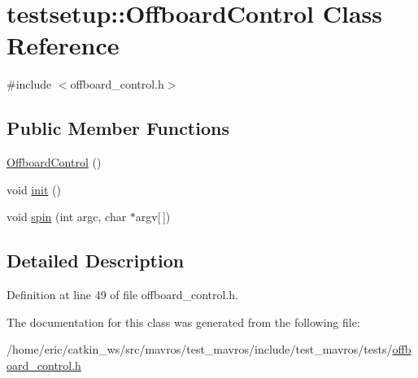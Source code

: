 \hypertarget{classtestsetup_1_1OffboardControl}{}\section{testsetup\+::Offboard\+Control Class Reference}
\label{classtestsetup_1_1OffboardControl}


{\ttfamily \#include $<$offboard\+\_\+control.\+h$>$}

\subsection*{Public Member Functions}
\begin{DoxyCompactItemize}
\item 
\mbox{\hyperlink{group__sitl__test_ga069b39408b92308e5a160e6da217a76d}{Offboard\+Control}} ()
\item 
void \mbox{\hyperlink{group__sitl__test_ga96ffcf517eede8e7fca2a9f156a88544}{init}} ()
\item 
void \mbox{\hyperlink{group__sitl__test_ga2750006357c60814f9ea8fdc1fb0d379}{spin}} (int argc, char $\ast$argv\mbox{[}$\,$\mbox{]})
\end{DoxyCompactItemize}


\subsection{Detailed Description}


Definition at line 49 of file offboard\+\_\+control.\+h.



The documentation for this class was generated from the following file\+:\begin{DoxyCompactItemize}
\item 
/home/eric/catkin\+\_\+ws/src/mavros/test\+\_\+mavros/include/test\+\_\+mavros/tests/\mbox{\hyperlink{offboard__control_8h}{offboard\+\_\+control.\+h}}\end{DoxyCompactItemize}
